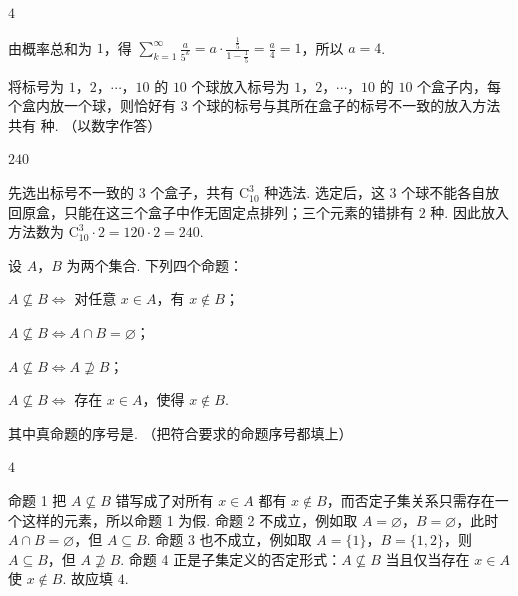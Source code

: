 \begin{answer}
\(4\)
\end{answer}

\begin{solution}
由概率总和为 \(1\)，得 \(\displaystyle\sum_{k=1}^{\infty}\frac{a}{5^k}=a\cdot\frac{\frac{1}{5}}{1-\frac{1}{5}}=\frac{a}{4}=1\)，所以 \(a=4\).
\end{solution}

\begin{problem}
将标号为 \(1\)，\(2\)，\(\cdots\)，\(10\) 的 \(10\) 个球放入标号为 \(1\)，\(2\)，\(\cdots\)，\(10\) 的 \(10\) 个盒子内，每个盒内放一个球，则恰好有 \(3\) 个球的标号与其所在盒子的标号不一致的放入方法共有\fillinblank{} 种. （以数字作答）
\end{problem}

\begin{answer}
\(240\)
\end{answer}

\begin{solution}
先选出标号不一致的 \(3\) 个盒子，共有 \(\mathrm C_{10}^{3}\) 种选法. 选定后，这 \(3\) 个球不能各自放回原盒，只能在这三个盒子中作无固定点排列；三个元素的错排有 \(2\) 种. 因此放入方法数为 \(\mathrm C_{10}^{3}\cdot2=120\cdot2=240\).
\end{solution}

\begin{problem}
设 \(A\)，\(B\) 为两个集合. 下列四个命题：

\begin{circlelist}
\item \(A \not\subseteq B \Leftrightarrow\) 对任意 \(x \in A\)，有 \(x \notin B\)；
\item \(A \not\subseteq B \Leftrightarrow A \cap B = \varnothing\)；
\item \(A \not\subseteq B \Leftrightarrow A \not\supseteq B\)；
\item \(A \not\subseteq B \Leftrightarrow\) 存在 \(x \in A\)，使得 \(x \notin B\).
\end{circlelist}

其中真命题的序号是\fillinblank{}. （把符合要求的命题序号都填上）
\end{problem}

\begin{answer}
\(4\)
\end{answer}

\begin{solution}
命题 1 把 \(A\not\subseteq B\) 错写成了对所有 \(x\in A\) 都有 \(x\notin B\)，而否定子集关系只需存在一个这样的元素，所以命题 1 为假. 命题 2 不成立，例如取 \(A=\varnothing\)，\(B=\varnothing\)，此时 \(A\cap B=\varnothing\)，但 \(A\subseteq B\). 命题 3 也不成立，例如取 \(A=\{1\}\)，\(B=\{1,2\}\)，则 \(A\subseteq B\)，但 \(A\not\supseteq B\). 命题 4 正是子集定义的否定形式：\(A\not\subseteq B\) 当且仅当存在 \(x\in A\) 使 \(x\notin B\). 故应填 \(4\).
\end{solution}

